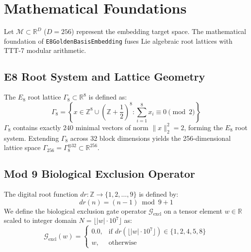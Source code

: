 \section{Mathematical Foundations}

Let $\mathcal{M} \subset \mathbb{R}^D$ ($D = 256$) represent the embedding target space. The mathematical foundation of \texttt{E8GoldenBasisEmbedding} fuses Lie algebraic root lattices with TTT-7 modular arithmetic.

\subsection{E8 Root System and Lattice Geometry}
The $E_8$ root lattice $\Gamma_8 \subset \mathbb{R}^8$ is defined as:
\begin{equation}
\Gamma_8 = \left\{ x \in \mathbb{Z}^8 \cup \left( \mathbb{Z} + \frac{1}{2} \right)^8 : \sum_{i=1}^8 x_i \equiv 0 \pmod{2} \right\}
\end{equation}
$\Gamma_8$ contains exactly $240$ minimal vectors of norm $\|x\|_2^2 = 2$, forming the $E_8$ root system. Extending $\Gamma_8$ across 32 block dimensions yields the 256-dimensional lattice space $\Gamma_{256} = \Gamma_8^{\otimes 32} \subset \mathbb{R}^{256}$.

\subsection{Mod 9 Biological Exclusion Operator}
The digital root function $dr: \mathbb{Z} \to \{1, 2, \dots, 9\}$ is defined by:
\begin{equation}
dr(n) = (n - 1) \bmod 9 + 1
\end{equation}
We define the biological exclusion gate operator $\mathcal{G}_{\text{excl}}$ on a tensor element $w \in \mathbb{R}$ scaled to integer domain $N = \lfloor |w| \cdot 10^7 \rfloor$ as:
\begin{equation}
\mathcal{G}_{\text{excl}}(w) = \begin{cases}
0.0, & \text{if } dr(\lfloor |w| \cdot 10^7 \rfloor) \in \{1, 2, 4, 5, 8\} \\
w, & \text{otherwise}
\end{cases}
\end{equation}

